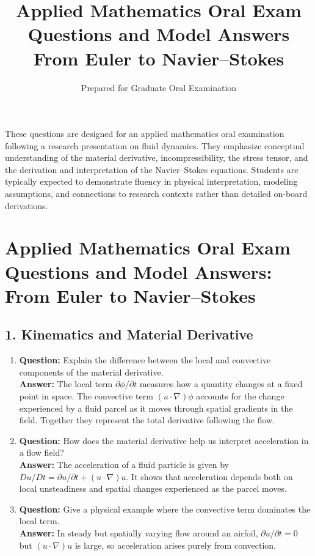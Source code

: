 \documentclass[12pt]{article}
\title{\vspace{-2em}\textbf{Applied Mathematics Oral Exam Questions and Model Answers}\\
\large From Euler to Navier--Stokes}
\author{Prepared for Graduate Oral Examination}
\date{}
\begin{document}
\maketitle
\thispagestyle{empty}

These questions are designed for an applied mathematics oral examination following a research presentation on fluid dynamics.  
They emphasize conceptual understanding of the material derivative, incompressibility, the stress tensor, and the derivation and interpretation of the Navier--Stokes equations.  
Students are typically expected to demonstrate fluency in physical interpretation, modeling assumptions, and connections to research contexts rather than detailed on-board derivations.

\section*{Applied Mathematics Oral Exam Questions and Model Answers:\\
From Euler to Navier--Stokes}

\subsection*{1. Kinematics and Material Derivative}
\begin{enumerate}
\item \textbf{Question:} Explain the difference between the local and convective components of the material derivative.\\
\textbf{Answer:} The local term $\partial \phi/\partial t$ measures how a quantity changes at a fixed point in space. The convective term $(u \cdot \nabla)\phi$ accounts for the change experienced by a fluid parcel as it moves through spatial gradients in the field. Together they represent the total derivative following the flow.

\item \textbf{Question:} How does the material derivative help us interpret acceleration in a flow field?\\
\textbf{Answer:} The acceleration of a fluid particle is given by $D u/Dt = \partial u/\partial t + (u \cdot \nabla)u$. It shows that acceleration depends both on local unsteadiness and spatial changes experienced as the parcel moves.

\item \textbf{Question:} Give a physical example where the convective term dominates the local term.\\
\textbf{Answer:} In steady but spatially varying flow around an airfoil, $\partial u/\partial t = 0$ but $(u \cdot \nabla)u$ is large, so acceleration arises purely from convection.
\end{enumerate}
\end{document}
